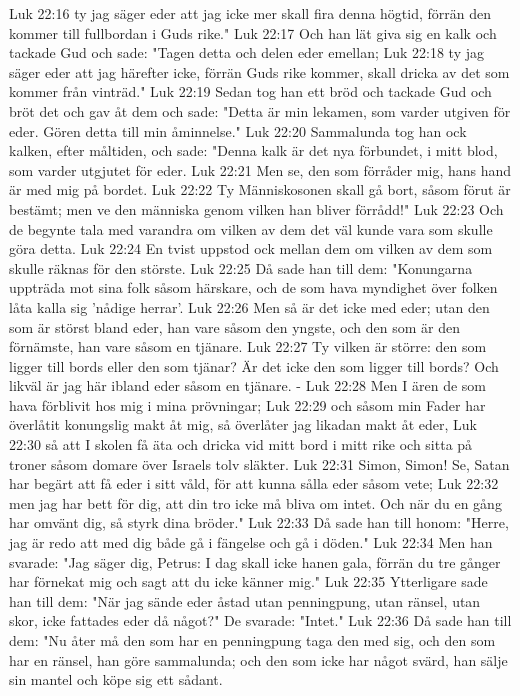Luk 22:16  ty jag säger eder att jag icke mer skall fira denna högtid, förrän den kommer till fullbordan i Guds rike."
Luk 22:17  Och han lät giva sig en kalk och tackade Gud och sade: "Tagen detta och delen eder emellan;
Luk 22:18  ty jag säger eder att jag härefter icke, förrän Guds rike kommer, skall dricka av det som kommer från vinträd."
Luk 22:19  Sedan tog han ett bröd och tackade Gud och bröt det och gav åt dem och sade: "Detta är min lekamen, som varder utgiven för eder. Gören detta till min åminnelse."
Luk 22:20  Sammalunda tog han ock kalken, efter måltiden, och sade: "Denna kalk är det nya förbundet, i mitt blod, som varder utgjutet för eder.
Luk 22:21  Men se, den som förråder mig, hans hand är med mig på bordet.
Luk 22:22  Ty Människosonen skall gå bort, såsom förut är bestämt; men ve den människa genom vilken han bliver förrådd!"
Luk 22:23  Och de begynte tala med varandra om vilken av dem det väl kunde vara som skulle göra detta.
Luk 22:24  En tvist uppstod ock mellan dem om vilken av dem som skulle räknas för den störste.
Luk 22:25  Då sade han till dem: "Konungarna uppträda mot sina folk såsom härskare, och de som hava myndighet över folken låta kalla sig 'nådige herrar'.
Luk 22:26  Men så är det icke med eder; utan den som är störst bland eder, han vare såsom den yngste, och den som är den förnämste, han vare såsom en tjänare.
Luk 22:27  Ty vilken är större: den som ligger till bords eller den som tjänar? Är det icke den som ligger till bords? Och likväl är jag här ibland eder såsom en tjänare. -
Luk 22:28  Men I ären de som hava förblivit hos mig i mina prövningar;
Luk 22:29  och såsom min Fader har överlåtit konungslig makt åt mig, så överlåter jag likadan makt åt eder,
Luk 22:30  så att I skolen få äta och dricka vid mitt bord i mitt rike och sitta på troner såsom domare över Israels tolv släkter.
Luk 22:31  Simon, Simon! Se, Satan har begärt att få eder i sitt våld, för att kunna sålla eder såsom vete;
Luk 22:32  men jag har bett för dig, att din tro icke må bliva om intet. Och när du en gång har omvänt dig, så styrk dina bröder."
Luk 22:33  Då sade han till honom: "Herre, jag är redo att med dig både gå i fängelse och gå i döden."
Luk 22:34  Men han svarade: "Jag säger dig, Petrus: I dag skall icke hanen gala, förrän du tre gånger har förnekat mig och sagt att du icke känner mig."
Luk 22:35  Ytterligare sade han till dem: "När jag sände eder åstad utan penningpung, utan ränsel, utan skor, icke fattades eder då något?" De svarade: "Intet."
Luk 22:36  Då sade han till dem: "Nu åter må den som har en penningpung taga den med sig, och den som har en ränsel, han göre sammalunda; och den som icke har något svärd, han sälje sin mantel och köpe sig ett sådant.
